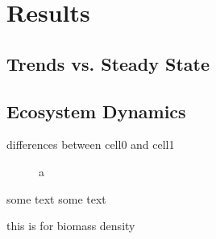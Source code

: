 \chapter{Results}
\label{chap:res}


\section{Trends vs. Steady State}
\label{chap:res:dyn:trend}

%

\begin{figure}
\centering

\caption[ShortCap]{}
\label{fig:chap:res:tsinit}
\end{figure}


\section{Ecosystem Dynamics}
\label{chap:res:dyn} 
differences between cell0 and cell1

\begin{figure}
\centering

\caption[Average body mass (aseasonal system)]{a}
\label{fig:chap:res:dyn:avg}
\end{figure}


%


some text some text




this is for biomass density



